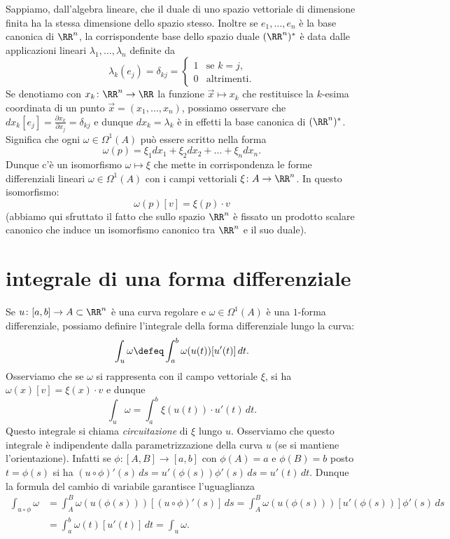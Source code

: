 Sappiamo, dall'algebra lineare, che il duale di uno spazio vettoriale 
di dimensione finita ha la stessa dimensione dello spazio stesso. 
Inoltre se $e_1,\dots, e_n$ è la base canonica di $\RR^n$,
la corrispondente base dello spazio duale $(\RR^n)^*$ è data 
dalle applicazioni lineari $\lambda_1,\dots, \lambda_n$ definite 
da 
\[
  \lambda_k(e_j)=\delta_{kj} = \begin{cases}
  1 & \text{se } k=j,\\
  0 & \text{altrimenti.}
  \end{cases}
\]
Se denotiamo con $x_k\colon \RR^n \to \RR$ la funzione $\vec x \mapsto x_k$ 
che restituisce la $k$-esima coordinata di un punto $\vec x = (x_1,\dots, x_n)$, 
possiamo osservare che $dx_k[e_j] = \frac{\partial x_k}{\partial x_j} = \delta_{kj}$ 
e dunque $dx_k = \lambda_k$ è in effetti la base canonica di $(\RR^n)^*$. 
Significa che ogni $\omega \in \Omega^1(A)$ può essere scritto 
nella forma 
\[
   \omega(p) = \xi_1 dx_1 + \xi_2 dx_2 + \dots + \xi_n dx_n.
\]
Dunque c'è un isomorfismo $\omega \mapsto \xi$ che mette in 
corrispondenza le forme differenziali lineari $\omega \in \Omega^1(A)$ 
con i campi vettoriali $\xi \colon A\to \RR^n$.
In questo isomorfismo:
\[
  \omega(p)[v] = \xi(p) \cdot v
\]
(abbiamo qui sfruttato il fatto che sullo spazio $\RR^n$ è fissato un prodotto 
scalare canonico che induce un isomorfismo canonico tra $\RR^n$ 
e il suo duale).

\section{integrale di una forma differenziale}

Se $u\colon [a,b]\to A\subset \RR^n$ è una curva regolare e $\omega\in \Omega^1(A)$ 
è una $1$-forma differenziale, possiamo definire l'integrale della forma differenziale lungo la curva:
\[
 \int_u \omega \defeq \int_a^b \omega(u(t))[u'(t)]\, dt.
\]
Osserviamo che se $\omega$ si rappresenta con il campo vettoriale $\xi$, si ha $\omega(x)[v] = \xi(x)\cdot v$ 
e dunque 
\[
 \int_u \omega = \int_a^b \xi(u(t))\cdot u'(t)\, dt.
\]
Questo integrale si chiama \emph{circuitazione} di $\xi$ lungo $u$.
Osserviamo che questo integrale è indipendente dalla parametrizzazione della curva $u$
(se si mantiene l'orientazione).
Infatti se $\phi\colon [A,B]\to [a,b]$ con $\phi(A)=a$ e $\phi(B)=b$ 
posto $t=\phi(s)$ si ha $(u\circ \phi)'(s)\, ds = u'(\phi(s)) \phi'(s)\, ds = u'(t)\, dt$.
Dunque la formula del cambio di variabile garantisce l'uguaglianza
\begin{align*}
\int_{u\circ \phi} \omega 
&= \int_A^B \omega(u(\phi(s)))[(u\circ \phi)'(s)]\, ds
= \int_A^B \omega(u(\phi(s)))[u'(\phi(s))] \phi'(s)\, ds\\
&= \int_a^b \omega(t)[u'(t)]\, dt = \int_u \omega.
\end{align*}

